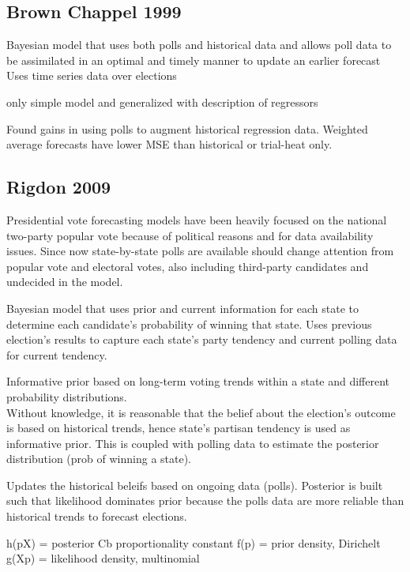 \documentclass[
  12pt]{article}
\begin{document}
\hypertarget{brown-chappel-1999}{%
\subsection{Brown Chappel 1999}\label{brown-chappel-1999}}

Bayesian model that uses both polls and historical data and allows poll
data to be assimilated in an optimal and timely manner to update an
earlier forecast Uses time series data over elections

only simple model and generalized with description of regressors

Found gains in using polls to augment historical regression data.
Weighted average forecasts have lower MSE than historical or trial-heat
only.

\hypertarget{rigdon-2009}{%
\subsection{Rigdon 2009}\label{rigdon-2009}}

Presidential vote forecasting models have been heavily focused on the
national two-party popular vote because of political reasons and for
data availability issues. Since now state-by-state polls are available
should change attention from popular vote and electoral votes, also
including third-party candidates and undecided in the model.

Bayesian model that uses prior and current information for each state to
determine each candidate's probability of winning that state. Uses
previous election's results to capture each state's party tendency and
current polling data for current tendency.

Informative prior based on long-term voting trends within a state and
different probability distributions.\\
Without knowledge, it is reasonable that the belief about the election's
outcome is based on historical trends, hence state's partisan tendency
is used as informative prior. This is coupled with polling data to
estimate the posterior distribution (prob of winning a state).

Updates the historical beleifs based on ongoing data (polls). Posterior
is built such that likelihood dominates prior because the polls data are
more reliable than historical trends to forecast elections.

h(p\textbar X) = posterior Cb proportionality constant f(p) = prior
density, Dirichelt g(X\textbar p) = likelihood density, multinomial
\end{document}
